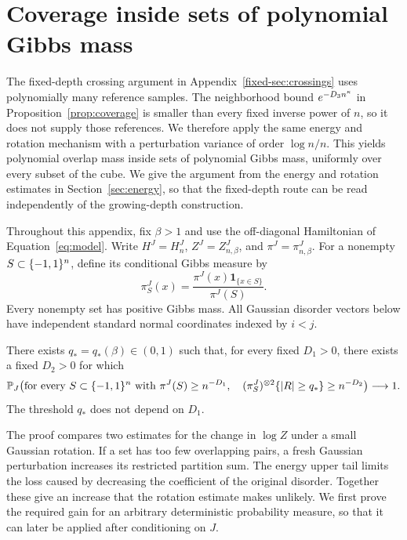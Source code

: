 \section{Coverage inside sets of polynomial Gibbs mass}
\label{poly-sec:coverage}

The fixed-depth crossing argument in Appendix~\ref{fixed-sec:crossings}
uses polynomially many reference samples. The neighborhood bound
$e^{-D_3n^\kappa}$ in Proposition~\ref{prop:coverage} is smaller than every
fixed inverse power of $n$, so it does not supply those references.
We therefore apply the same energy and rotation mechanism with a
perturbation variance of order $\log n/n$. This yields polynomial
overlap mass inside sets of polynomial Gibbs mass, uniformly over every
subset of the cube. We give the argument from the energy and rotation
estimates in Section~\ref{sec:energy}, so that the fixed-depth route can
be read independently of the growing-depth construction.

Throughout this appendix, fix $\beta>1$ and use the off-diagonal
Hamiltonian of Equation~\eqref{eq:model}. Write
$H^J=H_n^J$, $Z^J=Z_{n,\beta}^J$, and $\pi^J=\pi_{n,\beta}^J$.
For a nonempty $S\subset\{-1,1\}^n$, define its conditional Gibbs measure by
\[
 \pi_S^J(x)=\frac{\pi^J(x)\mathbf1_{\{x\in S\}}}{\pi^J(S)}.
\]
Every nonempty set has positive Gibbs mass. All Gaussian disorder vectors
below have independent standard normal coordinates indexed by $i<j$.

\begin{proposition}
\label{poly-prop:coverage}
There exists $q_*=q_*(\beta)\in(0,1)$ such that, for every fixed $D_1>0$,
there exists a fixed $D_2>0$ for which
\begin{equation}\label{poly-eq:coverage-uniform}
 \mathbb P_J\!\left(
  \text{for every }S\subset\{-1,1\}^n\text{ with }\pi^J(S)\ge n^{-D_1},\quad
  (\pi_S^J)^{\otimes2}\{|R|\ge q_*\}\ge n^{-D_2}
 \right)\longrightarrow1.
\end{equation}
The threshold $q_*$ does not depend on $D_1$.
\end{proposition}

The proof compares two estimates for the change in $\log Z$ under a small
Gaussian rotation. If a set has too few overlapping pairs, a fresh Gaussian
perturbation increases its restricted partition sum. The energy upper tail
limits the loss caused by decreasing the coefficient of the original
disorder. Together these give an increase that the rotation estimate makes
unlikely. We first prove the required gain for an arbitrary deterministic
probability measure, so that it can later be applied after conditioning on
$J$.

